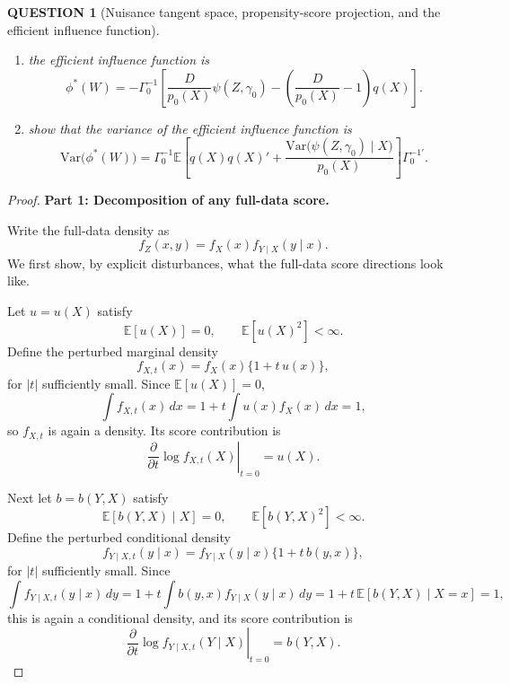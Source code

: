 \documentclass[12pt]{article}
\renewcommand{\(}{\left(}%
\renewcommand{\)}{\right)}%
\renewcommand{\[}{\left[}%
\renewcommand{\]}{\right]}%
\newtheorem{question}{QUESTION}[section]}
\newtheorem{proof}{Proof.}}
\begin{document}
\begin{question}[Nuisance tangent space, propensity-score projection, and the efficient influence function]
\begin{enumerate}
\item the efficient influence function is
\begin{equation*}
\phi^*(W)
=
-\Gamma_0^{-1}
\left[
\frac{D}{p_0(X)}\psi(Z,\gamma_0)
-
\left(\frac{D}{p_0(X)}-1\right)q(X)
\right].
\end{equation*}
\item show that the variance of the efficient influence function is
\begin{equation*}
\mathrm{Var}\bigl(\phi^*(W)\bigr)
=
\Gamma_0^{-1}
\mathbb{E}\!\left[
q(X)q(X)'
+
\frac{\mathrm{Var}\bigl(\psi(Z,\gamma_0)\mid X\bigr)}{p_0(X)}
\right]
\Gamma_0^{-1'} .
\end{equation*}
\end{enumerate}
\end{question}

\begin{proof}

\textbf{Part 1: Decomposition of any full-data score.}

Write the full-data density as
\begin{equation*}
f_Z(x,y)=f_X(x)f_{Y\mid X}(y\mid x).
\end{equation*}
We first show, by explicit disturbances, what the full-data score directions look like.

Let $u=u(X)$ satisfy
\begin{equation*}
\mathbb{E}[u(X)]=0,
\qquad
\mathbb{E}[u(X)^2]<\infty.
\end{equation*}
Define the perturbed marginal density
\begin{equation*}
f_{X,t}(x)=f_X(x)\{1+t\,u(x)\},
\end{equation*}
for $|t|$ sufficiently small. Since $\mathbb{E}[u(X)]=0$,
\begin{equation*}
\int f_{X,t}(x)\,dx
=
1+t\int u(x)f_X(x)\,dx
=
1,
\end{equation*}
so $f_{X,t}$ is again a density. Its score contribution is
\begin{equation*}
\left.\frac{\partial}{\partial t}\log f_{X,t}(X)\right|_{t=0}=u(X).
\end{equation*}

Next let $b=b(Y,X)$ satisfy
\begin{equation*}
\mathbb{E}[b(Y,X)\mid X]=0,
\qquad
\mathbb{E}[b(Y,X)^2]<\infty.
\end{equation*}
Define the perturbed conditional density
\begin{equation*}
f_{Y\mid X,t}(y\mid x)=f_{Y\mid X}(y\mid x)\{1+t\,b(y,x)\},
\end{equation*}
for $|t|$ sufficiently small. Since
\begin{equation*}
\int f_{Y\mid X,t}(y\mid x)\,dy
=
1+t\int b(y,x)f_{Y\mid X}(y\mid x)\,dy
=
1+t\,\mathbb{E}[b(Y,X)\mid X=x]
=
1,
\end{equation*}
this is again a conditional density, and its score contribution is
\begin{equation*}
\left.\frac{\partial}{\partial t}\log f_{Y\mid X,t}(Y\mid X)\right|_{t=0}=b(Y,X).
\end{equation*}


\end{proof}
\end{document}
